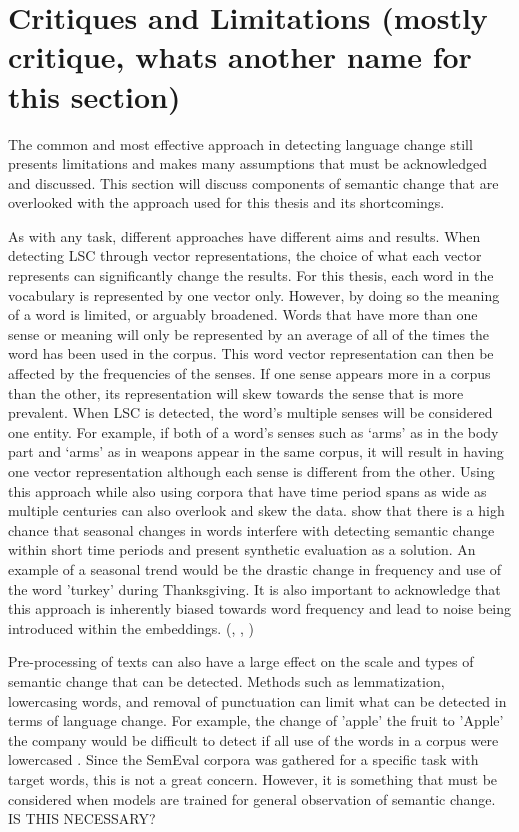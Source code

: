 \section{Critiques and Limitations (mostly critique, whats another name for this section)}
\label{sec:critiques}

The common and most effective approach in detecting language change still presents limitations and makes many assumptions that must be acknowledged and discussed. This section will discuss components of semantic change that are overlooked with the approach used for this thesis and its shortcomings. 

As with any task, different approaches have different aims and results. When detecting LSC through vector representations, the choice of what each vector represents can significantly change the results. For this thesis, each word in the vocabulary is represented by one vector only. However, by doing so the meaning of a word is limited, or arguably broadened. Words that have more than one sense or meaning will only be represented by an average of all of the times the word has been used in the corpus. This word vector representation can then be affected by the frequencies of the senses. If one sense appears more in a corpus than the other, its representation will skew towards the sense that is more prevalent.  When LSC is detected, the word’s multiple senses will be considered one entity. For example, if both of a word’s senses such as ‘arms’ as in the body part and ‘arms’ as in weapons appear in the same corpus, it will result in having one vector representation although each sense is different from the other. Using this approach while also using corpora that have time period spans as wide as multiple centuries can also overlook and skew the data. \citet{shoemark-etal-2019-room} show that there is a high chance that seasonal changes in words interfere with detecting semantic change within short time periods and present synthetic evaluation as a solution. An example of a seasonal trend would be the drastic change in frequency and use of the word 'turkey' during Thanksgiving. It is also important to acknowledge that this approach is inherently biased towards word frequency and lead to noise being introduced within the embeddings. (\citet{dubossarsky-etal-2017-outta}, \citet{kaiser-etal-2020-ims}, \citet{schlechtweg-etal-2020-semeval})

Pre-processing of texts can also have a large effect on the scale and types of semantic change that can be detected. Methods such as lemmatization, lowercasing words, and removal of punctuation can limit what can be detected in terms of language change. For example, the change of 'apple' the fruit to 'Apple' the company would be difficult to detect if all use of the words in a corpus were lowercased \citep{tahmasebi-survey2018}. Since the SemEval corpora was gathered for a specific task with target words, this is not a great concern. However, it is something that must be considered when models are trained for general observation of semantic change.
IS THIS NECESSARY?


